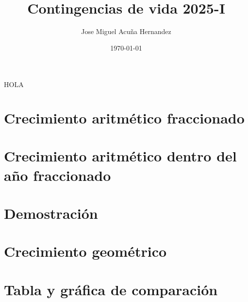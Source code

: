 \documentclass{article}
\title{Contingencias de vida 2025-I}
\author{Jose Miguel Acuña Hernandez}
\date{\today}
\begin{document}
\thispagestyle{firstpage}
\vspace*{9\baselineskip}

\renewcommand{\contentsname}{}
\begin{cuadrocontenido}
  \tableofcontents
\end{cuadrocontenido}

HOLA

\section{Crecimiento aritmético fraccionado}


\section{Crecimiento aritmético dentro del año fraccionado}


\section{Demostración}


\section{Crecimiento geométrico}

    
\section{Tabla y gráfica de comparación}

\end{document}
